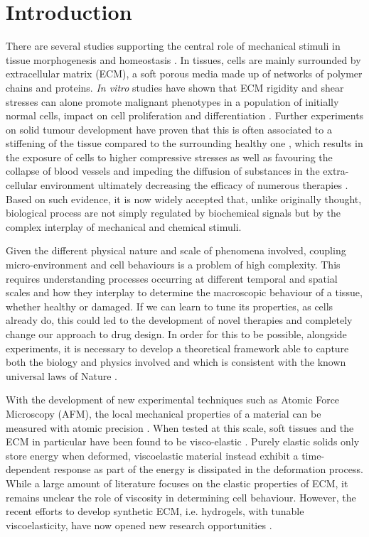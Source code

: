 \section{Introduction}

There are several studies supporting the central role of mechanical stimuli in tissue morphogenesis and homeostasis \cite{ex1,ex2}. In tissues, cells are mainly surrounded by extracellular matrix (ECM), a soft porous media made up of  networks of polymer chains and proteins. \textit{In vitro} studies have shown that ECM rigidity and shear stresses can alone promote malignant phenotypes in a population of initially normal cells, impact on cell proliferation and differentiation \cite{ex3}. Further experiments on solid tumour development have proven that this is often associated to a stiffening of the tissue compared to the surrounding healthy one \cite{ex4}, which results in the exposure of cells to higher compressive stresses as well as favouring the collapse of blood vessels and impeding the diffusion of substances in the extra-cellular environment ultimately decreasing the efficacy of numerous therapies \cite{ecm2}. Based on such evidence, it is now widely accepted that, unlike originally thought, biological process are not simply regulated by biochemical signals but by the complex interplay of mechanical and chemical stimuli.
 
Given the different physical nature and scale of phenomena involved, coupling micro-environment and cell behaviours is a problem of high complexity. This requires understanding processes occurring at different temporal and spatial scales and how they interplay to determine the macroscopic behaviour of a tissue, whether healthy or damaged. If we can learn to tune its properties, as cells already do, this could led to the development of novel therapies and completely change our approach to  drug design. In order for this to be possible, alongside experiments, it is necessary to develop a theoretical framework able to capture both the biology and physics involved and which is consistent with the known universal laws of Nature \cite{NET}. 

With the development of new experimental techniques such as Atomic Force Microscopy (AFM), the local mechanical properties of a material can be measured with atomic precision \cite{viscoporo}. When tested at this scale, soft tissues and the ECM in particular have been found to be visco-elastic \cite{ex5}. Purely elastic solids only store energy when deformed, viscoelastic material instead exhibit a time-dependent response as part of the energy is dissipated in the deformation process. While a large amount of literature focuses on the elastic properties of ECM, it remains unclear the role of viscosity in determining cell behaviour. However, the recent efforts to develop synthetic ECM, i.e. hydrogels, with tunable viscoelasticity, have now opened new research opportunities \cite{viscocell}. 

